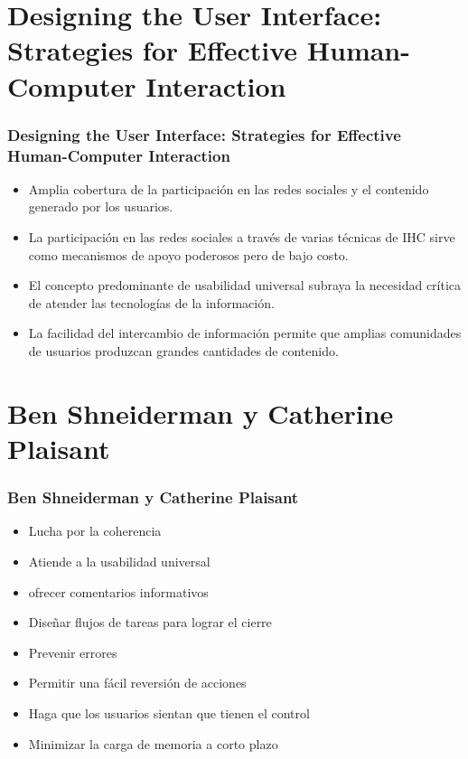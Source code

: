 \documentclass[11pt]{beamer}
\begin{document}
\section{Designing the User Interface: Strategies for Effective Human-Computer Interaction}
\begin{frame}
\frametitle{Designing the User Interface: Strategies for Effective Human-Computer Interaction}
\begin{itemize}
\item Amplia cobertura de la participación en las redes sociales y el contenido generado por los usuarios. 
\item La participación en las redes sociales a través de varias técnicas de IHC sirve como mecanismos de apoyo poderosos pero de bajo costo. 
\item El concepto predominante de usabilidad universal subraya la necesidad crítica de atender las tecnologías de la información.
\item La facilidad del intercambio de información permite que amplias comunidades de usuarios produzcan grandes cantidades de contenido.
\end{itemize}
\end{frame}

\section{Ben Shneiderman y Catherine Plaisant}
\begin{frame}
\frametitle{Ben Shneiderman y Catherine Plaisant}
\begin{itemize}
\item Lucha por la coherencia
\item Atiende a la usabilidad universal
\item ofrecer comentarios informativos
\item Diseñar flujos de tareas para lograr el cierre
\item Prevenir errores
\item Permitir una fácil reversión de acciones
\item Haga que los usuarios sientan que tienen el control
\item Minimizar la carga de memoria a corto plazo

\end{itemize}
\end{frame}
\end{document}
